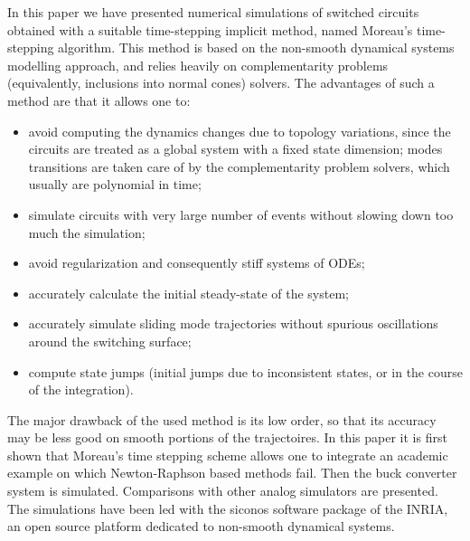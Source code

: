 \documentclass{article}
\begin{document}
In this paper we have presented numerical simulations of switched circuits obtained with a suitable time-stepping implicit method, named Moreau's time-stepping algorithm. This method is based on the non-smooth dynamical systems modelling approach, and relies heavily on complementarity problems (equivalently, inclusions into normal cones) solvers. The advantages of such a method are that it allows one to:

\begin{itemize}

\item avoid computing the dynamics changes due to topology variations, since the circuits are treated as a global system with a fixed state dimension; modes transitions are taken care of by the complementarity problem solvers, which usually are polynomial in time;

\item simulate circuits with very large number of events without slowing down too much the simulation;

\item avoid regularization and consequently stiff systems of ODEs;

\item accurately calculate the initial steady-state of the system;

\item accurately simulate sliding mode trajectories without spurious oscillations around the switching surface;

\item compute state jumps (initial jumps due to inconsistent states, or in the course of the integration). 

\end{itemize}


The major drawback of the used method is its low order, so that its accuracy may be less good on smooth portions of the trajectoires. In this paper it is first shown that Moreau's time stepping scheme allows one to integrate an academic example on which Newton-Raphson based methods fail. Then the buck converter system is simulated. Comparisons with other analog simulators are presented. The simulations have been led with the {\sc siconos} software package of the INRIA, an open source platform dedicated to non-smooth dynamical systems. 




\end{document}
